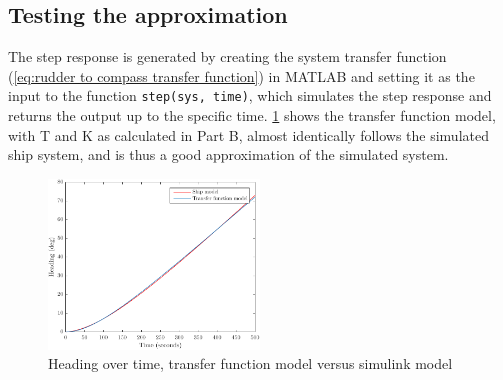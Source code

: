 \subsection{Testing the approximation}
The step response is generated by creating the system transfer function (\cref{eq:rudder to compass transfer function}) in MATLAB and setting it as the input to the function {\texttt{step(sys, time)}}, which simulates the step response and returns the output up to the specific time. \cref{fig:1d-riktig_amplitude} shows the transfer function model, with T and K as calculated in Part B, almost identically follows the simulated ship system, and is thus a good approximation of the simulated system.

\begin{figure}[h]
    \centering
    \includegraphics[width=0.5\textwidth]{images/1d-riktig_amplitude}
    \caption{Heading over time, transfer function model versus simulink model}
    \label{fig:1d-riktig_amplitude}
\end{figure}